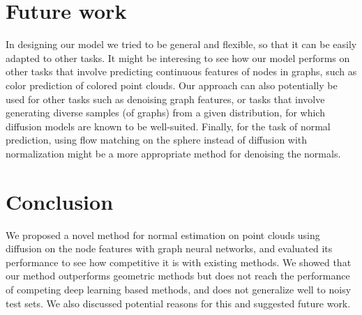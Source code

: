 \documentclass{acmart}
\newcommand{\instructions}[1]{\textcolor{red}{#1}\newline}
\renewcommand{\instructions}[1]{}    %
\begin{document}
\section{Future work}
\instructions{Suggest 1-2 to continue your work or futhure improve you work.
one-two paragraphs}
In designing our model we tried to be general and flexible, so that it can be easily adapted to other tasks. It might be interesing to see how our model performs on other tasks that involve predicting continuous features of nodes in graphs, such as color prediction of colored point clouds. Our approach can also potentially be used for other tasks such as denoising graph features, or tasks that involve generating diverse samples (of graphs) from a given distribution, for which diffusion models are known to be well-suited.
Finally, for the task of normal prediction, using flow matching \cite{lipman2023flowmatchinggenerativemodeling} on the sphere instead of diffusion with normalization might be a more appropriate method for denoising the normals.

\section{Conclusion}
\instructions{Conclude the project - what did you try to achieve, how you tried to achieve it, and did you manage to achieve that?  - one paragraph}
We proposed a novel method for normal estimation on point clouds using diffusion on the node features with graph neural networks, and evaluated its performance to see how competitive it is with existing methods. We showed that our method outperforms geometric methods but does not reach the performance of competing deep learning based methods, and does not generalize well to noisy test sets. We also discussed potential reasons for this and suggested future work.



\end{document}
